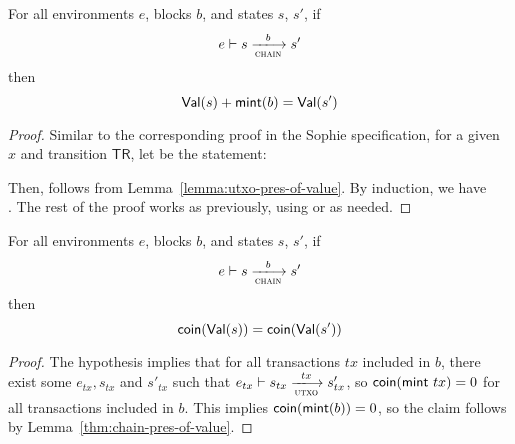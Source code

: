 \begin{theorem}
  \label{thm:chain-pres-of-value}
  For all environments $e$, blocks $b$, and states $s$, $s'$, if
  \begin{equation*}
    e\vdash s\trans{chain}{b}s'
  \end{equation*}
  then
  \begin{equation*}
    \mathsf{Val}(s) + \mathsf{mint}(b) = \mathsf{Val}(s')
  \end{equation*}
\end{theorem}
\begin{proof}
  Similar to the corresponding proof in the Sophie specification,
  for a given $x$ and transition $\mathsf{TR}$, let 
  be the statement:

  \noindent
  Then,  follows from
  Lemma~\ref{lemma:utxo-pres-of-value}.  By induction, we have \\
  . The rest of the proof works as
  previously, using  or  as needed.
\end{proof}

\begin{theorem}
  \label{thm:chain-pres-of-bcc}
  For all environments $e$, blocks $b$, and states $s$, $s'$, if
  \begin{equation*}
    e\vdash s\trans{chain}{b}s'
  \end{equation*}
  then
  \begin{equation*}
    \mathsf{coin}(\mathsf{Val}(s)) = \mathsf{coin}(\mathsf{Val}(s'))
  \end{equation*}
\end{theorem}
\begin{proof}
  The hypothesis implies that for all transactions $tx$ included in
  $b$, there exist some $e_{tx}, s_{tx}$ and $s'_{tx}$ such that
  $e_{tx}\vdash s_{tx}\trans{utxo}{tx}s'_{tx}$, so
  $\mathsf{coin}(\mathsf{mint}~tx) = 0$ for all transactions included
  in $b$. This implies $\mathsf{coin}(\mathsf{mint}(b)) = 0$, so the
  claim follows by Lemma~\ref{thm:chain-pres-of-value}.
\end{proof}